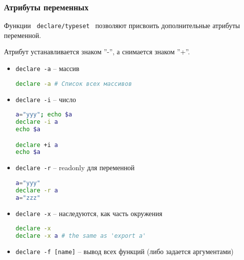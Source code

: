 \begin{frame}
	\frametitle{Атрибуты переменных}
	Функции \verb+ declare/typeset + позволяют присвоить дополнительные атрибуты переменной.

	Атрибут устанавливается знаком ''-'', а снимается знаком ''+''.

	\begin{itemize}
		\item {\tt declare -a} -- массив
			\begin{lstlisting}[language=sh]
declare -a # Список всех массивов
			\end{lstlisting} 
		\item {\tt declare -i} -- число
			\begin{lstlisting}[language=sh]
a="yyy"; echo $a
declare -i a
echo $a

declare +i a
echo $a
			\end{lstlisting}
		\item {\tt declare -r} -- readonly для переменной
			\begin{lstlisting}[language=sh]
a="yyy"
declare -r a
a="zzz"
			\end{lstlisting}
		\item {\tt declare -x} -- наследуются, как часть окружения
			\begin{lstlisting}[language=sh]
declare -x
declare -x a # the same as 'export a'
			\end{lstlisting}

		\item {\tt declare -f [name]} -- вывод всех функций (либо задается аргументами)

	\end{itemize}
\end{frame}

